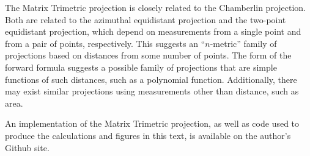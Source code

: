 \documentclass[]{interact}
\begin{document}
The Matrix Trimetric projection is closely related to the Chamberlin projection.
Both are related to the azimuthal equidistant projection and the two-point
equidistant projection, which depend on measurements from a single point and
from a pair of points, respectively. \citep{snyder87} This suggests an
``$n$-metric'' family of projections based on distances from some number of
points. The form of the forward formula suggests a possible family of
projections that are simple functions of such distances, such as a polynomial
function. Additionally, there may exist similar projections using measurements
other than distance, such as area.%


An implementation of the Matrix Trimetric projection, as well as code used to
produce the calculations and figures in this text,
is available on the author's Github site. \citep{blind}%



\end{document}
